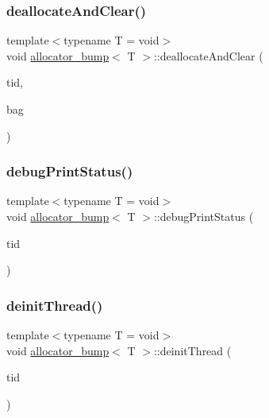 \subsubsection{\texorpdfstring{deallocate\+And\+Clear()}{deallocateAndClear()}}
{\footnotesize\ttfamily template$<$typename T  = void$>$ \\
void \hyperlink{classallocator__bump}{allocator\+\_\+bump}$<$ T $>$\+::deallocate\+And\+Clear (\begin{DoxyParamCaption}\item[{const int}]{tid,  }\item[{\hyperlink{classblockbag}{blockbag}$<$ T $>$ $\ast$const}]{bag }\end{DoxyParamCaption})\hspace{0.3cm}{\ttfamily [inline]}}

\mbox{\label{classallocator__bump_a59eee0e27ff339347eff13214bafd377}} 
\subsubsection{\texorpdfstring{debug\+Print\+Status()}{debugPrintStatus()}}
{\footnotesize\ttfamily template$<$typename T  = void$>$ \\
void \hyperlink{classallocator__bump}{allocator\+\_\+bump}$<$ T $>$\+::debug\+Print\+Status (\begin{DoxyParamCaption}\item[{const int}]{tid }\end{DoxyParamCaption})\hspace{0.3cm}{\ttfamily [inline]}}

\mbox{\label{classallocator__bump_af360b0037db6b2f1ec78d4cf02ed04d9}} 
\subsubsection{\texorpdfstring{deinit\+Thread()}{deinitThread()}}
{\footnotesize\ttfamily template$<$typename T  = void$>$ \\
void \hyperlink{classallocator__bump}{allocator\+\_\+bump}$<$ T $>$\+::deinit\+Thread (\begin{DoxyParamCaption}\item[{const int}]{tid }\end{DoxyParamCaption})\hspace{0.3cm}{\ttfamily [inline]}}


